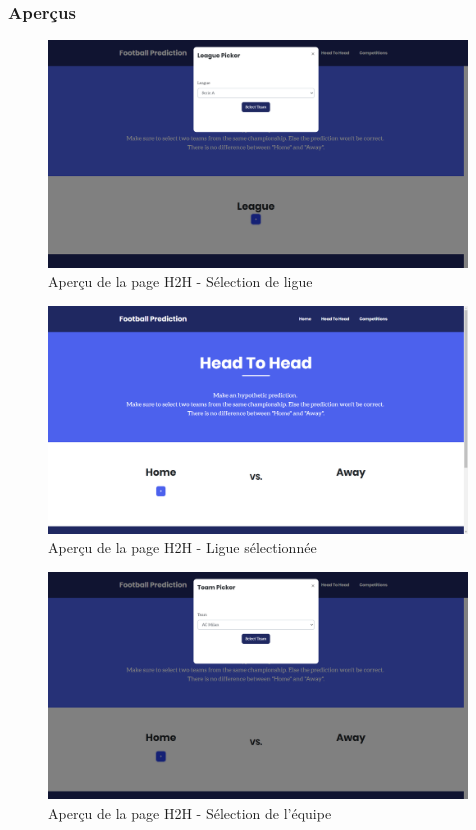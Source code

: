 \documentclass[a4paper,14pt]{extarticle}
\begin{document}
{\subsubsection{Aperçus}

\begin{figure}[htp]
    \centering
    \includegraphics[width=30em]{../img/leaguePickerH2H.png}
    \caption{Aperçu de la page H2H - Sélection de ligue}
    \label{fig:leaguePickerH2H}
\end{figure}

\begin{figure}[htp]
    \centering
    \includegraphics[width=30em]{../img/leagueSelectedH2H.png}
    \caption{Aperçu de la page H2H - Ligue sélectionnée}
    \label{fig:leagueSelectedH2H}
\end{figure}

\begin{figure}[htp]
    \centering
    \includegraphics[width=30em]{../img/teamPickerH2H.png}
    \caption{Aperçu de la page H2H - Sélection de l'équipe}
    \label{fig:teamPickerH2H}
\end{figure}

}
\end{document}
